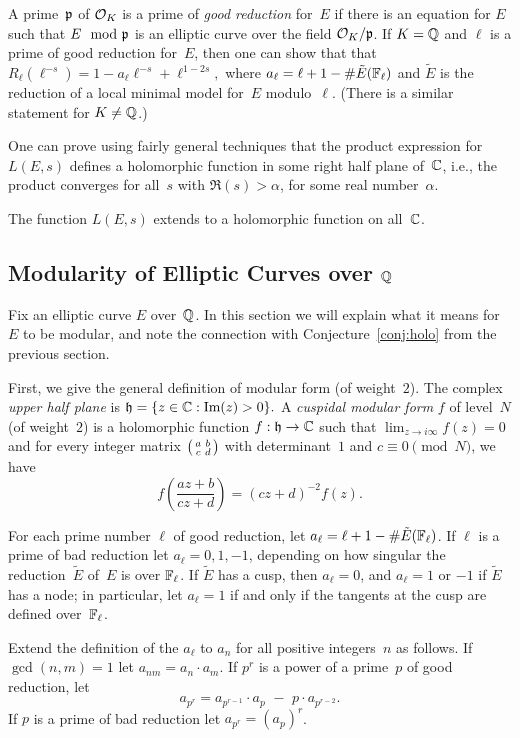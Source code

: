 A prime~$\mathfrak{p}$ of $\mathcal{O}_K$ is a prime of \emph{good reduction} for~$E$ if
there is an equation for $E$ such that $E \mod {\mathfrak{p}}$ is an elliptic
curve over the field $\mathcal{O}_K/\mathfrak{p}$. If $K=\mathbb{Q}$ and $\ell$ is a prime of
good reduction for~$E$, then one can show that that
$R_{\ell}(\ell^{-s}) = 1 - a_\ell \ell^{-s} + \ell^{1-2s},$
where
$
  a_{\ell} = \ell + 1 - \#\tilde{E}(\mathbb{F}_\ell)
$
and $\tilde{E}$ is the reduction of a local minimal
model for~$E$ modulo~$\ell$.  (There is a similar statement
for $K\neq \mathbb{Q}$.)

One can prove using fairly general techniques that the product
expression for $L(E,s)$ defines a holomorphic function in some right
half plane of~$\mathbb{C}$, i.e., the product converges for all~$s$ with
$\Re(s)>\alpha$, for some real number~$\alpha$.
\begin{conjecture}\label{conj:holo}
The function $L(E,s)$ extends to a holomorphic
function on all~$\mathbb{C}$.
\end{conjecture}

\subsection{Modularity of Elliptic Curves over $\mathbb{Q}$}
Fix an elliptic curve $E$ over~$\mathbb{Q}$.  In this section we will explain
what it means for $E$ to be modular, and note the connection with
Conjecture~\ref{conj:holo} from the previous section.

First, we give the general definition of modular form (of weight~$2$).
The complex {\em upper half plane} is
$
  \mathfrak{h}  = \{z  \in \mathbb{C} : \text{Im}(z) > 0\}.
$
A {\em cuspidal modular form} $f$ of level~$N$ (of weight~$2$) is a holomorphic
function
$
   f : \mathfrak{h} \to \mathbb{C}
$
such that $\lim_{z\to i\infty} f(z) = 0$ and for every integer matrix
$\left( \begin{smallmatrix}a&b\\c&d\end{smallmatrix}\right)$ with determinant~$1$ and $c\equiv 0 \pmod{N}$, we have
$$
  f\left( \frac{az + b}{cz + d} \right)
         = (cz+d)^{-2} f(z).
$$

For each prime number $\ell$ of good reduction, let $a_\ell = \ell+1 -
\#\tilde{E}(\mathbb{F}_{\ell})$.  If $\ell$ is a prime of bad reduction let
$a_\ell = 0,1,-1$, depending on how singular the reduction~$\tilde{E}$
of~$E$ is over $\mathbb{F}_{\ell}$.  If $\tilde{E}$ has a cusp, then $a_\ell=0$,
and $a_\ell=1$ or $-1$ if $\tilde{E}$ has a node; in particular,
let $a_\ell=1$ if
and only if the tangents at the cusp are defined over~$\mathbb{F}_{\ell}$.

Extend the definition of the $a_\ell$ to $a_n$ for all positive
integers~$n$ as follows.  If $\gcd(n,m)=1$ let $a_{nm} = a_n \cdot
a_m$.  If $p^r$ is a power of a prime~$p$ of good reduction, let
$$
 a_{p^r} = a_{p^{r-1}}\cdot a_p \,\,-\,\, p \cdot a_{p^{r-2}}.
$$
If $p$ is a prime of bad reduction let $a_{p^r} = (a_p)^r$.

